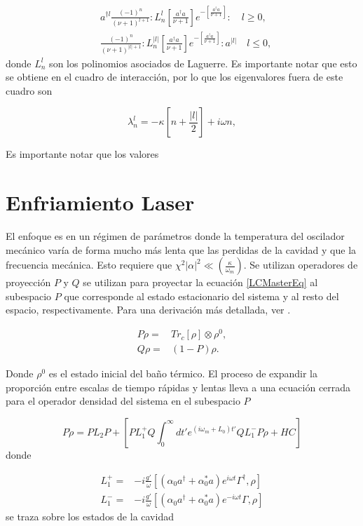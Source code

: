 \documentclass[10pt,a4paper]{report}
\begin{document}
\begin{align}\label{DefDB}
&a^{\dagger l}\frac{(-1)^n}{(\nu+1)^{l+1}}:L_n^l[\frac{a^\dagger a}{\nu+1}]e^{-[\frac{a^\dagger a}{\nu+1}]}:\quad l \geq 0, \\
&\frac{(-1)^n}{(\nu+1)^{|l|+1}}:L_n^{|l|}[\frac{a^\dagger a}{\nu+1}]e^{-[\frac{a^\dagger a}{\nu+1}]}:a^{|l|}\quad l \leq 0,
\end{align} donde $L_n^l$ son los polinomios asociados de Laguerre. Es importante notar que esto se obtiene en el cuadro de interacción,
por lo que los eigenvalores fuera de este cuadro son

\begin{equation}
\lambda_n^l = -\kappa[n + \frac{|l|}{2}] + i\omega n ,
\end{equation}

Es importante notar que los valores 

\section{Enfriamiento Laser}\label{LasCool}

El enfoque es en un régimen de parámetros donde la temperatura del oscilador mecánico varía de forma mucho más lenta que las perdidas de la cavidad y que la frecuencia mecánica. Esto requiere que $\chi^2 |\alpha|^2 \ll (\frac{\kappa}{\omega_m})$. Se utilizan operadores de proyección $P$ y $Q$ se utilizan para proyectar la ecuación  \eqref{LCMasterEq} al subespacio $P$ que corresponde al estado  estacionario del sistema y al resto del espacio, respectivamente. Para una derivación más detallada, ver \cite{NooshiLC}.

\begin{align}
P\rho=&Tr_c[\rho]\otimes \rho^{0}, \\
Q\rho=&(1-P)\rho.
\end{align}

Donde $\rho^0$ es el estado inicial del baño térmico. El proceso de expandir la proporción entre escalas de tiempo rápidas y
lentas lleva a una ecuación cerrada para el operador densidad del sistema en el subespacio $P$ 


\begin{equation}
P\dot{\rho} = PL_2P + [PL^+_1Q \int_0^\infty dt' e^{(i\omega_m +L_0)t'}QL_1^- P\rho + HC]
\end{equation} donde

\begin{align}
L_1^+ =& -i\frac{g'}{\omega}[(\alpha_0 a^{\dagger}+\alpha^*_0 a)e^{i\omega t} \Gamma^{\dagger},\rho]\\
L_1^-=& -i\frac{ g'}{\omega}[(\alpha_0 a^{\dagger}+\alpha^*_0 a)e^{-i\omega t}\Gamma,\rho]
\end{align}se traza sobre los estados de la cavidad
\end{document}
